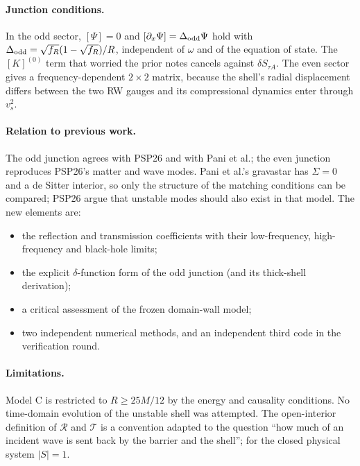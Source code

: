 \documentclass[11pt,a4paper]{article}
\numberwithin{equation}{section}
\newcommand{\sq}{\sqrt{f_R}}
\newcommand{\RR}{\mathcal R}
\newcommand{\TT}{\mathcal T}
\begin{document}
\paragraph{Junction conditions.} In the odd sector, $[\Psi]=0$ and $[\partial_x\Psi]=\Delta_{\rm odd}\Psi$ hold with
$\Delta_{\rm odd}=\sq(1-\sq)/R$, independent of $\omega$ and of the equation of state. The $[K]^{(0)}$ term that worried
the prior notes cancels against $\delta S_{\tau A}$. The even sector gives a frequency-dependent $2\times2$ matrix,
because the shell's radial displacement differs between the two RW gauges and its compressional dynamics enter
through $v_s^2$.

\paragraph{Relation to previous work.} The odd junction agrees with PSP26 and with Pani et al.; the even junction
reproduces PSP26's matter and wave modes. Pani et al.'s gravastar has $\Sigma=0$ and a de Sitter interior, so only the
structure of the matching conditions can be compared; PSP26 argue that unstable modes should also exist in that
model. The new elements are:
\begin{itemize}
\item the reflection and transmission coefficients with their low-frequency, high-frequency and black-hole limits;
\item the explicit $\delta$-function form of the odd junction (and its thick-shell derivation);
\item a critical assessment of the frozen domain-wall model;
\item two independent numerical methods, and an independent third code in the verification round.
\end{itemize}

\paragraph{Limitations.} Model C is restricted to $R\ge25M/12$ by the energy and causality conditions. No
time-domain evolution of the unstable shell was attempted. The open-interior definition of $\RR$ and $\TT$ is a
convention adapted to the question ``how much of an incident wave is sent back by the barrier and the shell''; for the
closed physical system $|S|=1$.
\end{document}
